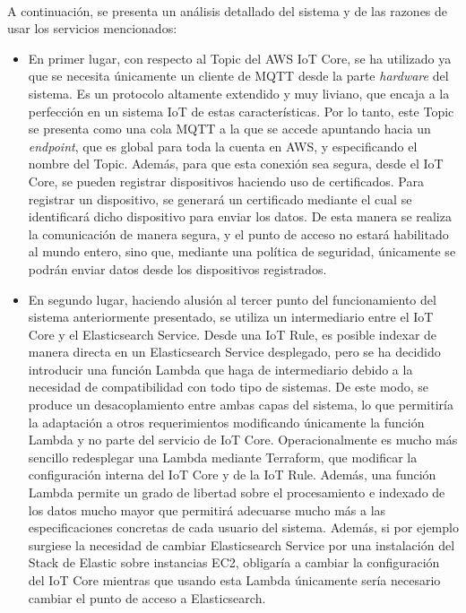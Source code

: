 \documentclass[../../memoria.tex]{subfiles}
\begin{document}
\paragraph{}
A continuación, se presenta un análisis detallado del sistema y de las razones de usar los servicios mencionados:

\begin{itemize}
    \item En primer lugar, con respecto al Topic del AWS IoT Core, se ha utilizado ya que se necesita únicamente un cliente de MQTT desde la parte \textit{hardware} del sistema. Es un protocolo altamente extendido y muy liviano, que encaja a la perfección en un sistema IoT de estas características. Por lo tanto, este Topic se presenta como una cola MQTT a la que se accede apuntando hacia un \textit{endpoint}, que es global para toda la cuenta en AWS, y especificando el nombre del Topic. Además, para que esta conexión sea segura, desde el IoT Core, se pueden registrar dispositivos haciendo uso de certificados. Para registrar un dispositivo, se generará un certificado mediante el cual se identificará dicho dispositivo para enviar los datos. De esta manera se realiza la comunicación de manera segura, y el punto de acceso no estará habilitado al mundo entero, sino que, mediante una política de seguridad, únicamente se podrán enviar datos desde los dispositivos registrados.

    \item En segundo lugar, haciendo alusión al tercer punto del funcionamiento del sistema anteriormente presentado, se utiliza un intermediario entre el IoT Core y el Elasticsearch Service. Desde una IoT Rule, es posible indexar de manera directa en un Elasticsearch Service desplegado, pero se ha decidido introducir una función Lambda que haga de intermediario debido a la necesidad de compatibilidad con todo tipo de sistemas. De este modo, se produce un desacoplamiento entre ambas capas del sistema, lo que permitiría la adaptación a otros requerimientos modificando únicamente la función Lambda y no parte del servicio de IoT Core. Operacionalmente es mucho más sencillo redesplegar una Lambda mediante Terraform, que modificar la configuración interna del IoT Core y de la IoT Rule. Además, una función Lambda permite un grado de libertad sobre el procesamiento e indexado de los datos mucho mayor que permitirá adecuarse mucho más a las especificaciones concretas de cada usuario del sistema. Además, si por ejemplo surgiese la necesidad de cambiar Elasticsearch Service por una instalación del Stack de Elastic sobre instancias EC2, obligaría a cambiar la configuración del IoT Core mientras que usando esta Lambda únicamente sería necesario cambiar el punto de acceso a Elasticsearch.


\end{itemize}
\end{document}

